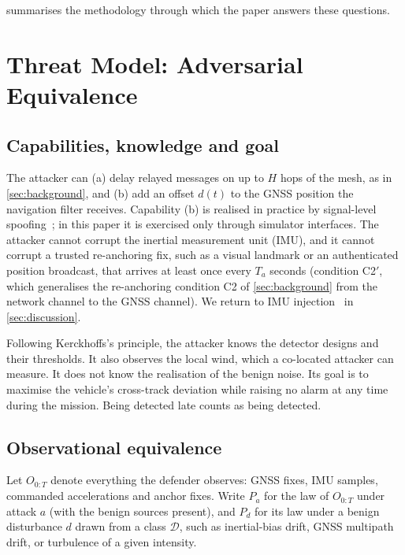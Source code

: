 \documentclass[letterpaper,twocolumn,10pt]{article}
\newcommand{\Dclass}{\mathcal{D}}
\theoremstyle{remark}
\begin{document}
 summarises the methodology through which the paper answers
these questions.

\section{Threat Model: Adversarial Equivalence}
\label{sec:threat}
\subsection{Capabilities, knowledge and goal}
The attacker can (a) delay relayed messages on up to $H$ hops of the mesh, as in
\cref{sec:background}, and (b) add an offset $d(t)$ to the GNSS position the
navigation filter receives. Capability (b) is realised in practice by
signal-level spoofing~\cite{humphreys2008,tippenhauer2011,kerns2014}; in this
paper it is exercised only through simulator interfaces. The attacker cannot
corrupt the inertial measurement unit (IMU), and it cannot corrupt a trusted
re-anchoring fix, such as a visual landmark or an authenticated position
broadcast, that arrives at least once every $T_a$ seconds (condition C2$'$, which
generalises the re-anchoring condition C2 of \cref{sec:background} from the
network channel to the GNSS channel). We return to IMU injection~\cite{son2015,trippel2017} in
\cref{sec:discussion}.

Following Kerckhoffs's principle, the attacker knows the detector designs and
their thresholds. It also observes the local wind, which a co-located attacker
can measure. It does not know the realisation of the benign noise. Its goal is to
maximise the vehicle's cross-track deviation while raising no alarm at any time
during the mission. Being detected late counts as being detected.

\subsection{Observational equivalence}
Let $O_{0:T}$ denote everything the defender observes: GNSS fixes, IMU samples,
commanded accelerations and anchor fixes. Write $P_a$ for the law of $O_{0:T}$
under attack $a$ (with the benign sources present), and $P_d$ for its law under a
benign disturbance $d$ drawn from a class $\Dclass$, such as inertial-bias drift,
GNSS multipath drift, or turbulence of a given intensity.
\end{document}

